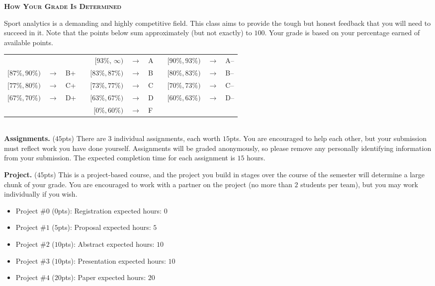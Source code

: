 \documentclass[11pt]{article}
\begin{document}
\newpage
\textbf{\textsc{How Your Grade Is Determined}}
\begin{adjustwidth}{1cm}{0cm}
	Sport analytics is a demanding and highly competitive field. This class aims to provide the tough but honest feedback that you will need to succeed in it. Note that the points below sum approximately (but not exactly) to $100$. Your grade is based on your percentage earned of available points.
  \begin{center}
    \begin{tabular}{rclcrclcrcl}
                      &               &     & & $[93\%,\,\infty)$ & $\rightarrow$ & A & & $[90\%, 93\%)$ & $\rightarrow$	& A--\\
      $[87\%, 90\%)$  & $\rightarrow$	& B+  & & $[83\%, 87\%)$  & $\rightarrow$ & B & & $[80\%, 83\%)$ & $\rightarrow$	& B--\\
      $[77\%, 80\%)$  & $\rightarrow$	& C+  & & $[73\%, 77\%)$  & $\rightarrow$ & C & & $[70\%, 73\%)$ & $\rightarrow$	& C--\\
      $[67\%, 70\%)$  & $\rightarrow$	& D+  & & $[63\%, 67\%)$  & $\rightarrow$ & D & & $[60\%, 63\%)$ & $\rightarrow$  & D--\\
                      &               &     & & $[ 0\%, 60\%)$  & $\rightarrow$ & F\\
    \end{tabular}
  \end{center}
  ~\\
	\textbf{Assignments.} ($45$pts) There are $3$ individual assignments, each worth $15$pts. You are encouraged to help each other, but your submission must reflect work you have done yourself. Assignments will be graded anonymously, so please remove any personally identifying information from your submission. The expected completion time for each assignment is $15$ hours.

  \textbf{Project.} ($45$pts) This is a project-based course, and the project you build in stages over the course of the semester will determine a large chunk of your grade. You are encouraged to work with a partner on the project (no more than $2$ students per team), but you may work individually if you wish.
  \begin{itemize}
    \item Project \#$0$ ($0$pts): Registration                   \hfill expected hours: $0$
    \item Project \#$1$ ($5$pts): Proposal                       \hfill expected hours: $5$
    \item Project \#$2$ ($10$pts): Abstract                      \hfill expected hours: $10$
    \item Project \#$3$ ($10$pts): Presentation                  \hfill expected hours: $10$
    \item Project \#$4$ ($20$pts): Paper                         \hfill expected hours: $20$
  \end{itemize}


\end{adjustwidth}
\end{document}
